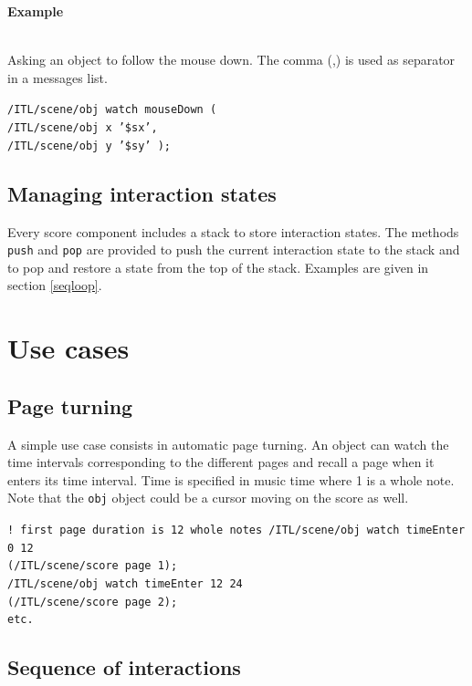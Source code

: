 \documentclass{article}
\newcommand{\code}[1]		{\texttt{\small #1}}
\newcounter{excount}
\newcommand{\exemple}			{\vspace{1mm} \hspace*{-4.5mm}\textbf{Example \arabic{excount}} \addtocounter{excount}{1}}
\newcommand{\sample}	[1]		{\begin{center}\colorbox{mygrey}{
								\begin{minipage}[t]{0.95\columnwidth} 
								{\small \texttt{#1}}
								\end{minipage}}\end{center}}
\begin{document}
\exemple  \\ Asking an object to follow the mouse down. The comma (,) is used as separator in a messages list.
\sample{/ITL/scene/obj watch mouseDown (\\
\hspace*{12mm}/ITL/scene/obj x '\$sx', \\
\hspace*{12mm}/ITL/scene/obj y '\$sy' );}


\subsection{Managing interaction states}
Every score component includes a stack to store interaction states. The methods \code{push} and \code{pop} are provided to push the current interaction state to the stack and to pop and restore a state from the top of the stack. Examples are given in section \ref{seqloop}.



\section{Use cases}\label{sec:exemples}


\subsection{Page turning} \label{pageturn}

A simple use case consists in automatic page turning. An object can watch the time intervals corresponding to the different pages and recall a page when it enters its time interval. Time is specified in music time where 1 is a whole note. Note that the \code{obj} object could be a cursor moving on the score as well.
\sample{! first page duration is 12 whole notes
/ITL/scene/obj watch timeEnter 0 12	\\
\hspace*{25mm}(/ITL/scene/score page 1);	\\
/ITL/scene/obj watch timeEnter 12 24	\\
\hspace*{25mm}(/ITL/scene/score page 2);	\\
\hspace*{1mm}etc.
}


\subsection{Sequence of interactions} \label{seqitl}
\end{document}
